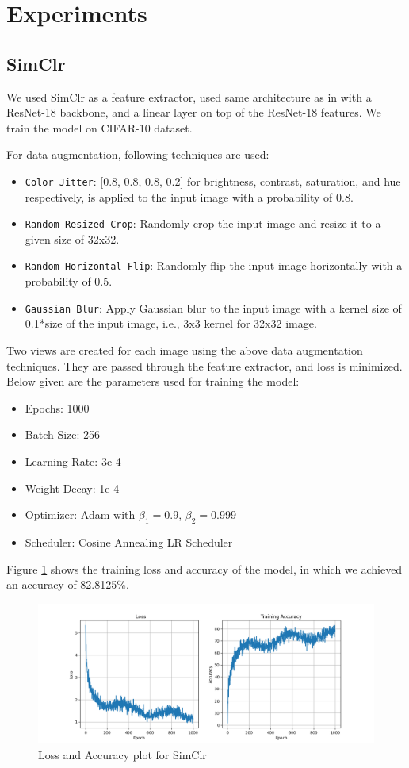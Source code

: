 \section{Experiments}
\label{sec:experiments}

\subsection{SimClr}
We used SimClr as a feature extractor, used same architecture as in \cite{chen2020simple} with a ResNet-18 backbone, and a linear layer on top of the ResNet-18 features. We train the model on CIFAR-10 dataset.

For data augmentation, following techniques are used:
\begin{itemize}
    \item \texttt{Color Jitter}: [0.8, 0.8, 0.8, 0.2] for brightness, contrast, saturation, and hue respectively, is applied to the input image with a probability of 0.8.
    \item \texttt{Random Resized Crop}: Randomly crop the input image and resize it to a given size of 32x32.
    \item \texttt{Random Horizontal Flip}: Randomly flip the input image horizontally with a probability of 0.5.
    \item \texttt{Gaussian Blur}: Apply Gaussian blur to the input image with a kernel size of 0.1*size of the input image, i.e., 3x3 kernel for 32x32 image.
\end{itemize}
Two views are created for each image using the above data augmentation techniques. They are passed through the feature extractor, and loss is minimized.
Below given are the parameters used for training the model:
\begin{itemize}
    \item Epochs: 1000
    \item Batch Size: 256
    \item Learning Rate: 3e-4
    \item Weight Decay: 1e-4
    \item Optimizer: Adam with $\beta_1=0.9$, $\beta_2=0.999$
    \item Scheduler: Cosine Annealing LR Scheduler  
\end{itemize}
Figure \ref{fig:loss_accuracy} shows the training loss and accuracy of the model, in which we achieved an accuracy of 82.8125\%.
\begin{figure}[h]
    \centering
    \includegraphics[width=1.0\linewidth]{images/loss_accuracy.png}
    \caption{Loss and Accuracy plot for SimClr}
    \label{fig:loss_accuracy}
\end{figure}

